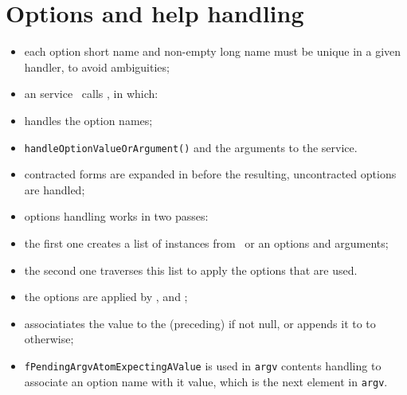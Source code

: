 \section{Options and help handling}

\begin{itemize}
\item each option short name and non-empty long name must be unique in a given handler,
    to avoid ambiguities;

\item an service \mainFunction\ calls , in which:
  \item {} handles the option names;
  \item {\tt handleOptionValueOrArgument()}%
      and the arguments to the service.

\item contracted forms are expanded in  before the resulting,
    uncontracted options are handled;

\item options handling works in two passes:
    \item the first one creates a list of  instances from
        \argcargv\ or an options and arguments;
    \item the second one traverses this list to apply the options that are used.

\item the options are applied by ,  and
    ;

\item {} associatiates the value
    to the (preceding)  if not null,
    or appends it to  to otherwise;

\item {\tt fPendingArgvAtomExpectingAValue} is used in {\tt argv} contents handling
    to associate an option name with it value, which is the next element in {\tt argv}.

\end{itemize}


